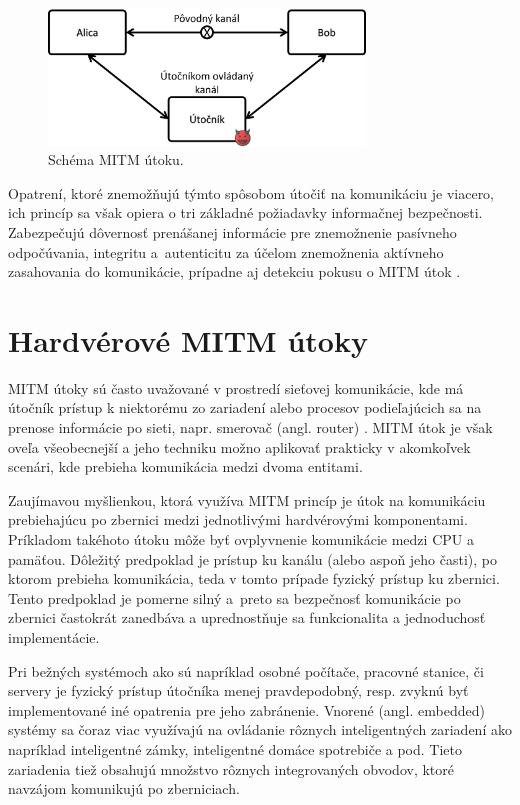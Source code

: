 \begin{figure}
    \centerline{\includegraphics[width=0.75\textwidth]{images/misc/mitm.png}}
    \caption[Schéma MITM útoku]{Schéma MITM útoku.}
    \label{obr:mitm}
\end{figure}

Opatrení, ktoré znemožňujú týmto spôsobom útočiť na komunikáciu je viacero, ich princíp sa však opiera o tri základné požiadavky informačnej bezpečnosti. Zabezpečujú dôvernosť prenášanej informácie pre znemožnenie pasívneho odpočúvania, integritu a~autenticitu za účelom znemožnenia aktívneho zasahovania do komunikácie, prípadne aj detekciu pokusu o MITM útok \cite{mitmTheory}. 

\section{Hardvérové MITM útoky}
MITM útoky sú často uvažované v prostredí sieťovej komunikácie, kde má útočník prístup k niektorému zo zariadení alebo procesov podieľajúcich sa na prenose informácie po sieti, napr. smerovač (angl. router) \cite{mitmTheory}. MITM útok je však oveľa všeobecnejší a jeho techniku možno aplikovať prakticky v akomkoľvek scenári, kde prebieha komunikácia medzi dvoma entitami.

Zaujímavou myšlienkou, ktorá využíva MITM princíp je útok na komunikáciu prebiehajúcu po zbernici medzi jednotlivými hardvérovými komponentami. Príkladom takéhoto útoku môže byť ovplyvnenie komunikácie medzi CPU a pamäťou. Dôležitý predpoklad je prístup ku kanálu (alebo aspoň jeho časti), po ktorom prebieha komunikácia, teda v tomto prípade fyzický prístup ku zbernici. Tento predpoklad je pomerne silný a~preto sa bezpečnosť komunikácie po zbernici častokrát zanedbáva a uprednostňuje sa funkcionalita a jednoduchosť implementácie.

Pri bežných systémoch ako sú napríklad osobné počítače, pracovné stanice, či servery je fyzický prístup útočníka menej pravdepodobný, resp. zvyknú byť implementované iné opatrenia pre jeho zabránenie. Vnorené (angl. embedded) systémy sa čoraz viac využívajú na ovládanie rôznych inteligentných zariadení ako napríklad inteligentné zámky, inteligentné domáce spotrebiče a pod. Tieto zariadenia tiež obsahujú množstvo rôznych integrovaných obvodov, ktoré navzájom komunikujú po zberniciach.

